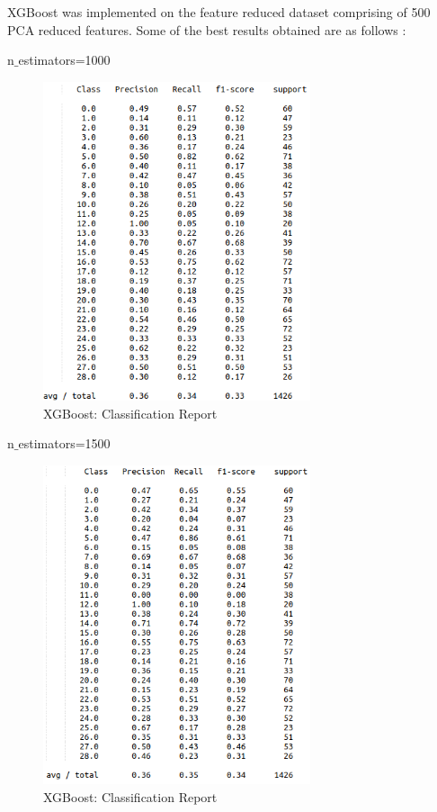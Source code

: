 \documentclass[12pt]{report}
\begin{document}
XGBoost was implemented on the feature reduced dataset comprising of 500 PCA reduced features. Some of the best results obtained are as follows :

n$\_$estimators=1000
\begin{figure}[H]
  \centering
  \includegraphics[width=0.7\textwidth]{Images/xgb1.png}
  \caption{XGBoost: Classification Report}
\end{figure}

\newpage
n$\_$estimators=1500
\begin{figure}[H]
  \centering
  \includegraphics[width=0.7\textwidth]{Images/xgb2.png}
  \caption{XGBoost: Classification Report}
\end{figure}
\end{document}
